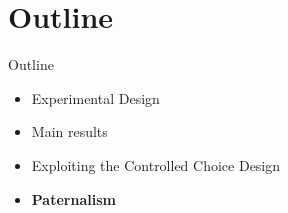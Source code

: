 \documentclass[8pt]{beamer}
\begin{document}





\section{Outline}
\begin{frame}{Outline}
     \begin{itemize}
         \vfill\item Experimental Design
         \vfill\item Main results
          \vfill\item Exploiting the Controlled Choice Design
         \vfill\item \textbf{Paternalism}
     \end{itemize}
\end{frame}
\end{document}
